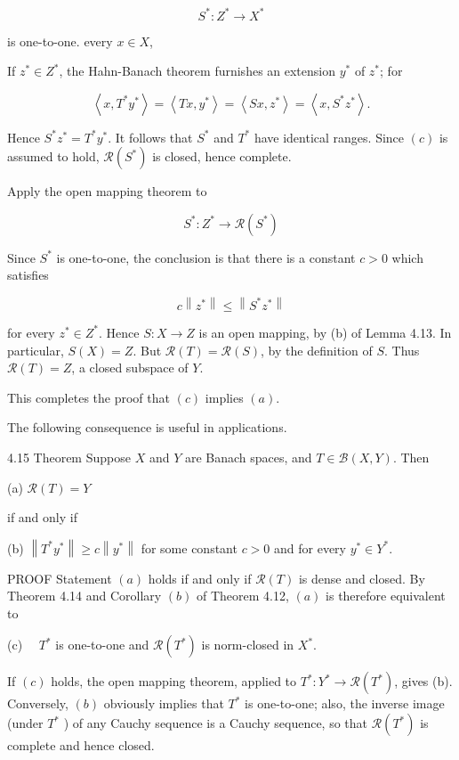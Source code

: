 \documentclass[10pt]{article}
\begin{document}
$$
S^{*}: Z^{*} \rightarrow X^{*}
$$

is one-to-one.
every $x \in X$,

If $z^{*} \in Z^{*}$, the Hahn-Banach theorem furnishes an extension $y^{*}$ of $z^{*}$; for

$$
\left\langle x, T^{*} y^{*}\right\rangle=\left\langle T x, y^{*}\right\rangle=\left\langle S x, z^{*}\right\rangle=\left\langle x, S^{*} z^{*}\right\rangle .
$$

Hence $S^{*} z^{*}=T^{*} y^{*}$. It follows that $S^{*}$ and $T^{*}$ have identical ranges. Since $(c)$ is assumed to hold, $\mathscr{R}\left(S^{*}\right)$ is closed, hence complete.

Apply the open mapping theorem to

$$
S^{*}: Z^{*} \rightarrow \mathscr{R}\left(S^{*}\right)
$$

Since $S^{*}$ is one-to-one, the conclusion is that there is a constant $c>0$ which satisfies

$$
c\left\|z^{*}\right\| \leq\left\|S^{*} z^{*}\right\|
$$

for every $z^{*} \in Z^{*}$. Hence $S: X \rightarrow Z$ is an open mapping, by (b) of Lemma 4.13. In particular, $S(X)=Z$. But $\mathscr{R}(T)=\mathscr{R}(S)$, by the definition of $S$. Thus $\mathscr{R}(T)=Z$, a closed subspace of $Y$.

This completes the proof that $(c)$ implies $(a)$.

The following consequence is useful in applications.

4.15 Theorem Suppose $X$ and $Y$ are Banach spaces, and $T \in \mathscr{B}(X, Y)$. Then

(a) $\mathscr{R}(T)=Y$

if and only if

(b) $\left\|T^{*} y^{*}\right\| \geq c\left\|y^{*}\right\|$ for some constant $c>0$ and for every $y^{*} \in Y^{*}$.

PROOF Statement $(a)$ holds if and only if $\mathscr{R}(T)$ is dense and closed. By Theorem 4.14 and Corollary $(b)$ of Theorem 4.12, $(a)$ is therefore equivalent to

(c) $\quad T^{*}$ is one-to-one and $\mathscr{R}\left(T^{*}\right)$ is norm-closed in $X^{*}$.

If $(c)$ holds, the open mapping theorem, applied to $T^{*}: Y^{*} \rightarrow \mathscr{R}\left(T^{*}\right)$, gives (b). Conversely, $(b)$ obviously implies that $T^{*}$ is one-to-one; also, the inverse image (under $T^{*}$ ) of any Cauchy sequence is a Cauchy sequence, so that $\mathscr{R}\left(T^{*}\right)$ is complete and hence closed.
\end{document}
